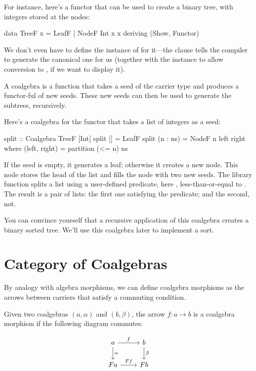 \documentclass[DaoFP]{subfiles}
\begin{document}
For instance, here's a functor that can be used to create a binary tree, with integers stored at the nodes:
\begin{haskell}
data TreeF x = LeafF | NodeF Int x x
  deriving (Show, Functor)
\end{haskell}
We don't even have to define the instance of  for it---the  clause tells the compiler to generate the canonical one for us (together with the  instance to allow conversion to , if we want to display it).

A coalgebra is a function that takes a seed of the carrier type and produces a functor-ful of new seeds. These new seeds can then be used to generate the subtrees, recursively. 

Here's a coalgebra for the functor  that takes a list of integers as a seed:
\begin{haskell}
split :: Coalgebra TreeF [Int]
split [] = LeafF
split (n : ns) = NodeF n left right
  where
    (left, right) = partition (<= n) ns
\end{haskell}
If the seed is empty, it generates a leaf; otherwise it creates a new node. This node stores the head of the list and fills the node with two new seeds. The library function  splits a list using a user-defined predicate, here , less-than-or-equal to . The result is a pair of lists: the first one satisfying the predicate; and the second, not. 

You can convince yourself that a recursive application of this coalgebra creates a binary sorted tree. We'll use this coalgebra later to implement a sort.

\section{Category of Coalgebras}

By analogy with algebra morphisms, we can define coalgebra morphisms as the arrows between carriers that satisfy a commuting condition. 

Given two coalgebras $(a, \alpha)$ and $(b, \beta)$, the arrow $f \colon a \to b$ is a coalgebra morphism if the following diagram commutes:

\[
 \begin{tikzcd}
 a 
 \arrow[r, "f"]
 \arrow[d, "\alpha"]
 & b
\arrow[d, "\beta"]
 \\
F  a
 \arrow[r, "F f"]
 & F b
  \end{tikzcd}
\]
\end{document}
